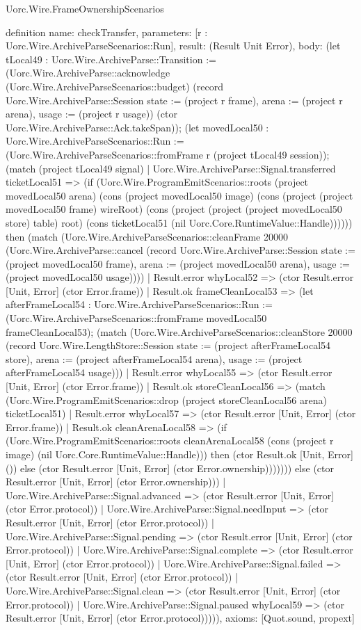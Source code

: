 \begin{lexlean}{Uorc.Wire.FrameOwnershipScenarios}
\begin{semanticmodule}
definition{
  name: checkTransfer,
  parameters: [r : Uorc.Wire.ArchiveParseScenarios::Run],
  result: (Result Unit Error),
  body: (let tLocal49 : Uorc.Wire.ArchiveParse::Transition := (Uorc.Wire.ArchiveParse::acknowledge (Uorc.Wire.ArchiveParseScenarios::budget) (record Uorc.Wire.ArchiveParse::Session {state := (project r frame), arena := (project r arena), usage := (project r usage)}) (ctor Uorc.Wire.ArchiveParse::Ack.takeSpan)); (let movedLocal50 : Uorc.Wire.ArchiveParseScenarios::Run := (Uorc.Wire.ArchiveParseScenarios::fromFrame r (project tLocal49 session)); (match (project tLocal49 signal)
    | Uorc.Wire.ArchiveParse::Signal.transferred ticketLocal51 => (if (Uorc.Wire.ProgramEmitScenarios::roots (project movedLocal50 arena) (cons (project movedLocal50 image) (cons (project (project movedLocal50 frame) wireRoot) (cons (project (project (project movedLocal50 store) table) root) (cons ticketLocal51 (nil Uorc.Core.RuntimeValue::Handle)))))) then (match (Uorc.Wire.ArchiveParseScenarios::cleanFrame 20000 (Uorc.Wire.ArchiveParse::cancel (record Uorc.Wire.ArchiveParse::Session {state := (project movedLocal50 frame), arena := (project movedLocal50 arena), usage := (project movedLocal50 usage)})))
      | Result.error whyLocal52 => (ctor Result.error [Unit, Error] (ctor Error.frame))
      | Result.ok frameCleanLocal53 => (let afterFrameLocal54 : Uorc.Wire.ArchiveParseScenarios::Run := (Uorc.Wire.ArchiveParseScenarios::fromFrame movedLocal50 frameCleanLocal53); (match (Uorc.Wire.ArchiveParseScenarios::cleanStore 20000 (record Uorc.Wire.LengthStore::Session {state := (project afterFrameLocal54 store), arena := (project afterFrameLocal54 arena), usage := (project afterFrameLocal54 usage)}))
        | Result.error whyLocal55 => (ctor Result.error [Unit, Error] (ctor Error.frame))
        | Result.ok storeCleanLocal56 => (match (Uorc.Wire.ProgramEmitScenarios::drop (project storeCleanLocal56 arena) ticketLocal51)
          | Result.error whyLocal57 => (ctor Result.error [Unit, Error] (ctor Error.frame))
          | Result.ok cleanArenaLocal58 => (if (Uorc.Wire.ProgramEmitScenarios::roots cleanArenaLocal58 (cons (project r image) (nil Uorc.Core.RuntimeValue::Handle))) then (ctor Result.ok [Unit, Error] ()) else (ctor Result.error [Unit, Error] (ctor Error.ownership))))))) else (ctor Result.error [Unit, Error] (ctor Error.ownership)))
    | Uorc.Wire.ArchiveParse::Signal.advanced => (ctor Result.error [Unit, Error] (ctor Error.protocol))
    | Uorc.Wire.ArchiveParse::Signal.needInput => (ctor Result.error [Unit, Error] (ctor Error.protocol))
    | Uorc.Wire.ArchiveParse::Signal.pending => (ctor Result.error [Unit, Error] (ctor Error.protocol))
    | Uorc.Wire.ArchiveParse::Signal.complete => (ctor Result.error [Unit, Error] (ctor Error.protocol))
    | Uorc.Wire.ArchiveParse::Signal.failed => (ctor Result.error [Unit, Error] (ctor Error.protocol))
    | Uorc.Wire.ArchiveParse::Signal.clean => (ctor Result.error [Unit, Error] (ctor Error.protocol))
    | Uorc.Wire.ArchiveParse::Signal.paused whyLocal59 => (ctor Result.error [Unit, Error] (ctor Error.protocol))))),
  axioms: [Quot.sound, propext]
}


\end{semanticmodule}
\end{lexlean}
